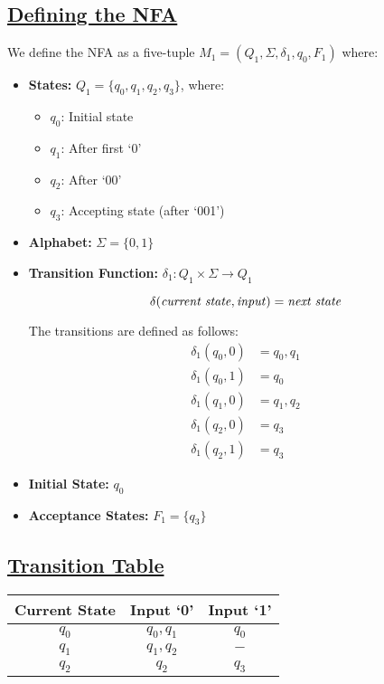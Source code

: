 \documentclass[12pt]{article}
\begin{document}
	\subsection*{\underline{Defining the NFA}}
	We define the NFA as a five-tuple \(M_1 = (Q_1, \Sigma, \delta_1, q_0, F_1)\) where:
	\begin{itemize}[leftmargin=*]
		\item \textbf{States:} \(Q_1 = \{q_0, q_1, q_2, q_3\}\), where:
		\begin{itemize}
			\item \(q_0\): Initial state
			\item \(q_1\): After first `0'
			\item \(q_2\): After `00'
			\item \(q_3\): Accepting state (after `001')
		\end{itemize}
		\item \textbf{Alphabet:} \(\Sigma = \{0, 1\}\)
		
		\item \textbf{Transition Function:} \(\delta_1: Q_1 \times \Sigma \to Q_1\)
		
		\begin{mdframed}[linewidth=1pt, leftmargin=3cm, rightmargin=3.2cm]
			\[\delta(\text{\textit{current state}}, \text{\textit{input}}) = \text{\textit{next state}}\]
		\end{mdframed}
		
		The transitions are defined as follows:
		\begin{align*}
			\delta_1(q_0, 0) &= q_0,q_1 \\
			\delta_1(q_0, 1) &= q_0 \\
			\delta_1(q_1, 0) &= q_1,q_2 \\
			\delta_1(q_2, 0) &= q_3 \\
			\delta_1(q_2, 1) &= q_3
		\end{align*}
		
		\item \textbf{Initial State:} \(q_0\)
		
		\item \textbf{Acceptance States:} \(F_1 = \{q_3\}\)
	\end{itemize}
	
	
	\subsection*{\underline{Transition Table}}
	\begin{center}
		\begin{tabular}{ccc}
			\toprule
			\textbf{Current State} & \textbf{Input `0'} & \textbf{Input `1'} \\
			\midrule
			$q_0$ & $q_0,q_1$ & $q_0$ \\
			$q_1$ & $q_1,q_2$ & $-$ \\
			$q_2$ & $q_2$ & $q_3$ \\
			\bottomrule
		\end{tabular}
	\end{center}
	
\end{document}

